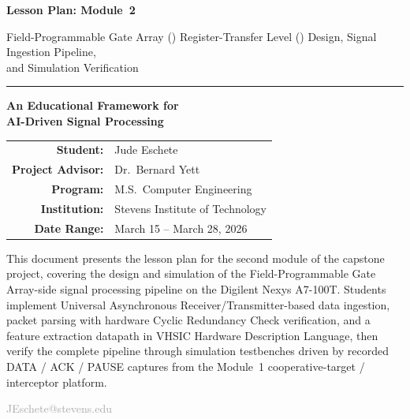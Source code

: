 \documentclass[11pt,letterpaper]{article}
\begin{document}
	\begin{titlepage}
		\centering
		\vspace*{2cm}

		{\Huge\bfseries\color{stevens} Lesson Plan: Module~2\par}
		\vspace{0.5cm}
		{\LARGE\color{darkgray} Field-Programmable Gate Array (\FPGA{}) Register-Transfer Level (\RTL{}) Design, Signal Ingestion Pipeline,\\[4pt]
			and Simulation Verification\par}

		\vspace{1.5cm}
		\rule{0.6\textwidth}{1pt}
		\vspace{1.5cm}

		{\Large\textbf{An Educational Framework for\\[4pt]
				AI-Driven Signal Processing}\par}

		\vspace{1.5cm}

		\begin{tabular}{rl}
			\textbf{Student:}         & Jude Eschete \\
			\textbf{Project Advisor:} & Dr.\ Bernard Yett \\
			\textbf{Program:}         & M.S.\ Computer Engineering \\
			\textbf{Institution:}     & Stevens Institute of Technology \\
			\textbf{Date Range:}      & March 15 -- March 28, 2026 \\
		\end{tabular}

		\vspace{2cm}

		\begin{tcolorbox}[colback=lightgray, colframe=darkgray, width=0.85\textwidth, arc=2pt]
			\centering\small
			This document presents the lesson plan for the second module of the capstone project,
			covering the design and simulation of the Field-Programmable Gate Array-side signal processing pipeline on the
			Digilent Nexys A7-100T. Students implement Universal Asynchronous Receiver/Transmitter-based data ingestion, packet parsing
			with hardware Cyclic Redundancy Check verification, and a feature extraction datapath in VHSIC Hardware Description Language, then verify
			the complete pipeline through simulation testbenches driven by recorded DATA / ACK / PAUSE captures from
			the Module~1 cooperative-target / interceptor platform.
		\end{tcolorbox}

		\vfill
		{\small\textcolor{darkgray}{JEschete@stevens.edu}}
	\end{titlepage}
\end{document}
